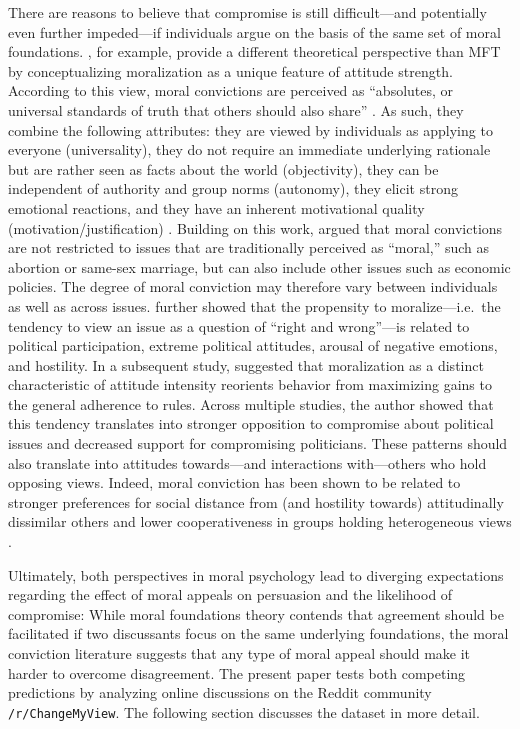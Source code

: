 \documentclass[12pt,]{article}
\begin{document}
There are reasons to believe that compromise is still difficult---and
potentially even further impeded---if individuals argue on the basis of
the same set of moral foundations. \citet{skitka2005moral}, for example,
provide a different theoretical perspective than MFT by conceptualizing
moralization as a unique feature of attitude strength. According to this
view, moral convictions are perceived as ``absolutes, or universal
standards of truth that others should also share''
\citep[269]{skitka2010psychology}. As such, they combine the following
attributes: they are viewed by individuals as applying to everyone
(universality), they do not require an immediate underlying rationale
but are rather seen as facts about the world (objectivity), they can be
independent of authority and group norms (autonomy), they elicit strong
emotional reactions, and they have an inherent motivational quality
(motivation/justification) \citep{skitka2010psychology}. Building on
this work, \citet{ryan2014reconsidering} argued that moral convictions
are not restricted to issues that are traditionally perceived as
``moral,'' such as abortion or same-sex marriage, but can also include
other issues such as economic policies. The degree of moral conviction
may therefore vary between individuals as well as across issues.
\citet{ryan2014reconsidering} further showed that the propensity to
moralize---i.e.~the tendency to view an issue as a question of ``right
and wrong''---is related to political participation, extreme political
attitudes, arousal of negative emotions, and hostility. In a subsequent
study, \citet{ryan2016no} suggested that moralization as a distinct
characteristic of attitude intensity reorients behavior from maximizing
gains to the general adherence to rules. Across multiple studies, the
author showed that this tendency translates into stronger opposition to
compromise about political issues and decreased support for compromising
politicians. These patterns should also translate into attitudes
towards---and interactions with---others who hold opposing views.
Indeed, moral conviction has been shown to be related to stronger
preferences for social distance from (and hostility towards)
attitudinally dissimilar others and lower cooperativeness in groups
holding heterogeneous views \citep{skitka2005moral}.

Ultimately, both perspectives in moral psychology lead to diverging
expectations regarding the effect of moral appeals on persuasion and the
likelihood of compromise: While moral foundations theory contends that
agreement should be facilitated if two discussants focus on the same
underlying foundations, the moral conviction literature suggests that
any type of moral appeal should make it harder to overcome disagreement.
The present paper tests both competing predictions by analyzing online
discussions on the Reddit community \texttt{/r/ChangeMyView}. The
following section discusses the dataset in more detail.
\end{document}
